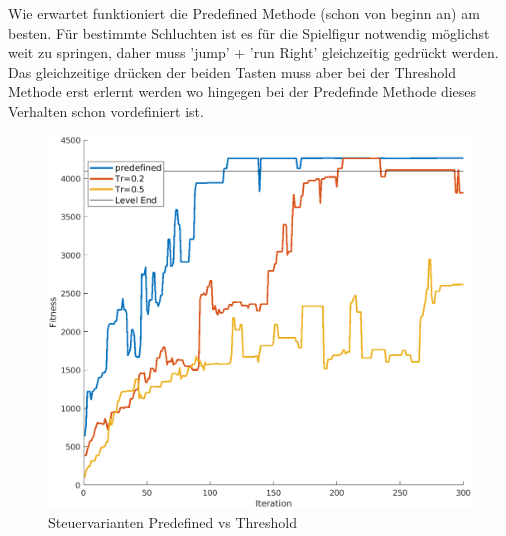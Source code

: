 \documentclass{hbrs-ecta-report}
\begin{document}
Wie erwartet funktioniert die Predefined Methode (schon von beginn an) am besten. Für bestimmte Schluchten ist es für die Spielfigur notwendig möglichst weit zu springen, daher muss 'jump' + 'run Right' gleichzeitig gedrückt werden. Das gleichzeitige drücken der beiden Tasten muss aber bei der Threshold Methode erst erlernt werden wo hingegen bei der Predefinde Methode dieses Verhalten schon vordefiniert ist.
\begin{figure}[h!]
	\centering
	\includegraphics[width=0.93\linewidth]{img/controls.png}
	\caption{Steuervarianten Predefined vs Threshold}
	\label{fig:control}
\end{figure}

\newpage
\end{document}

